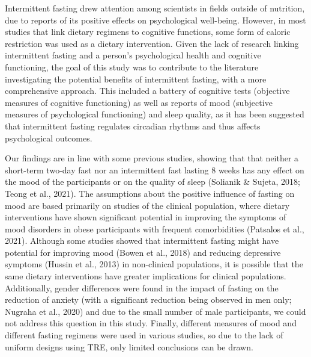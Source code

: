 \documentclass[authordate, empirical,issue]{jote-new-article}
\begin{document}
\begin{originalPurpose}

  Intermittent fasting drew attention among scientists in fields outside of nutrition, due to reports of its positive effects on psychological well-being. However, in most studies that link dietary regimens to cognitive functions, some form of caloric restriction was used as a dietary intervention. Given the lack of research linking intermittent fasting and a person's psychological health and cognitive functioning, the goal of this study was to contribute to the literature investigating the potential benefits of intermittent fasting, with a more comprehensive approach. This included a battery of cognitive tests (objective measures of cognitive functioning) as well as reports of mood (subjective measures of psychological functioning) and sleep quality, as it has been suggested that intermittent fasting regulates circadian rhythms and thus affects psychological outcomes.

\end{originalPurpose}

Our findings are in line with some previous studies, showing that that neither a short-term two-day fast nor an intermittent fast lasting 8 weeks has any effect on the mood of the participants or on the quality of sleep (Solianik \& Sujeta, 2018; Teong et al., 2021). The assumptions about the positive influence of fasting on mood are based primarily on studies of the clinical population, where dietary interventions have shown significant potential in improving the symptoms of mood disorders in obese participants with frequent comorbidities (Patsalos et al., 2021). Although some studies showed that intermittent fasting might have potential for improving mood (Bowen et al., 2018) and reducing depressive symptoms (Hussin et al., 2013) in non-clinical populations, it is possible that the same dietary interventions have greater implications for clinical populations. Additionally, gender differences were found in the impact of fasting on the reduction of anxiety (with a significant reduction being observed in men only; Nugraha et al., 2020) and due to the small number of male participants, we could not address this question in this study. Finally, different measures of mood and different fasting regimens were used in various studies, so due to the lack of uniform designs using TRE, only limited conclusions can be drawn.
\end{document}
